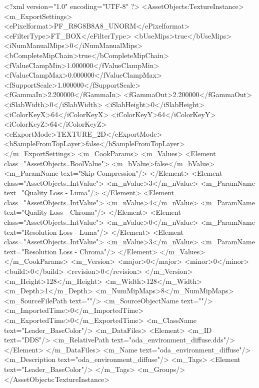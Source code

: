 <?xml version="1.0" encoding="UTF-8" ?>
<AssetObjects:TextureInstance>
<m_ExportSettings>
<ePixelformat>PF_R8G8B8A8_UNORM</ePixelformat>
<eFilterType>FT_BOX</eFilterType>
<bUseMips>true</bUseMips>
<iNumManualMips>0</iNumManualMips>
<bCompleteMipChain>true</bCompleteMipChain>
<fValueClampMin>1.000000</fValueClampMin>
<fValueClampMax>0.000000</fValueClampMax>
<fSupportScale>1.000000</fSupportScale>
<fGammaIn>2.200000</fGammaIn>
<fGammaOut>2.200000</fGammaOut>
<iSlabWidth>0</iSlabWidth>
<iSlabHeight>0</iSlabHeight>
<iColorKeyX>64</iColorKeyX>
<iColorKeyY>64</iColorKeyY>
<iColorKeyZ>64</iColorKeyZ>
<eExportMode>TEXTURE_2D</eExportMode>
<bSampleFromTopLayer>false</bSampleFromTopLayer>
</m_ExportSettings>
<m_CookParams>
<m_Values>
<Element class="AssetObjects..BoolValue">
<m_bValue>false</m_bValue>
<m_ParamName text="Skip Compression"/>
</Element>
<Element class="AssetObjects..IntValue">
<m_nValue>3</m_nValue>
<m_ParamName text="Quality Loss - Luma"/>
</Element>
<Element class="AssetObjects..IntValue">
<m_nValue>4</m_nValue>
<m_ParamName text="Quality Loss - Chroma"/>
</Element>
<Element class="AssetObjects..IntValue">
<m_nValue>0</m_nValue>
<m_ParamName text="Resolution Loss - Luma"/>
</Element>
<Element class="AssetObjects..IntValue">
<m_nValue>3</m_nValue>
<m_ParamName text="Resolution Loss - Chroma"/>
</Element>
</m_Values>
</m_CookParams>
<m_Version>
<major>0</major>
<minor>0</minor>
<build>0</build>
<revision>0</revision>
</m_Version>
<m_Height>128</m_Height>
<m_Width>128</m_Width>
<m_Depth>1</m_Depth>
<m_NumMipMaps>8</m_NumMipMaps>
<m_SourceFilePath text=""/>
<m_SourceObjectName text=""/>
<m_ImportedTime>0</m_ImportedTime>
<m_ExportedTime>0</m_ExportedTime>
<m_ClassName text="Leader_BaseColor"/>
<m_DataFiles>
<Element>
<m_ID text="DDS"/>
<m_RelativePath text="oda_environment_diffuse.dds"/>
</Element>
</m_DataFiles>
<m_Name text="oda_environment_diffuse"/>
<m_Description text="oda_environment_diffuse"/>
<m_Tags>
<Element text="Leader_BaseColor"/>
</m_Tags>
<m_Groups/>
</AssetObjects:TextureInstance>
